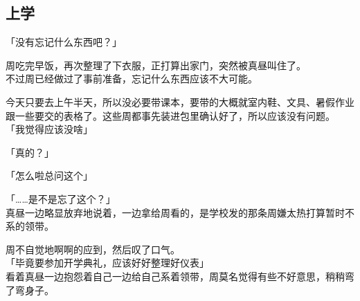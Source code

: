 \subsection{上学}

「没有忘记什么东西吧？」

周吃完早饭，再次整理了下衣服，正打算出家门，突然被真昼叫住了。\\

不过周已经做过了事前准备，忘记什么东西应该不大可能。

今天只要去上午半天，所以没必要带课本，要带的大概就室内鞋、文具、暑假作业跟一些要交的表格了。这些周都事先装进包里确认好了，所以应该没有问题。\\

「我觉得应该没啥」

「真的？」

「怎么啦总问这个」

「……是不是忘了这个？」\\

真昼一边略显放弃地说着，一边拿给周看的，是学校发的那条周嫌太热打算暂时不系的领带。

周不自觉地啊啊的应到，然后叹了口气。\\

「毕竟要参加开学典礼，应该好好整理好仪表」\\

看着真昼一边抱怨着自己一边给自己系着领带，周莫名觉得有些不好意思，稍稍弯了弯身子。\\

